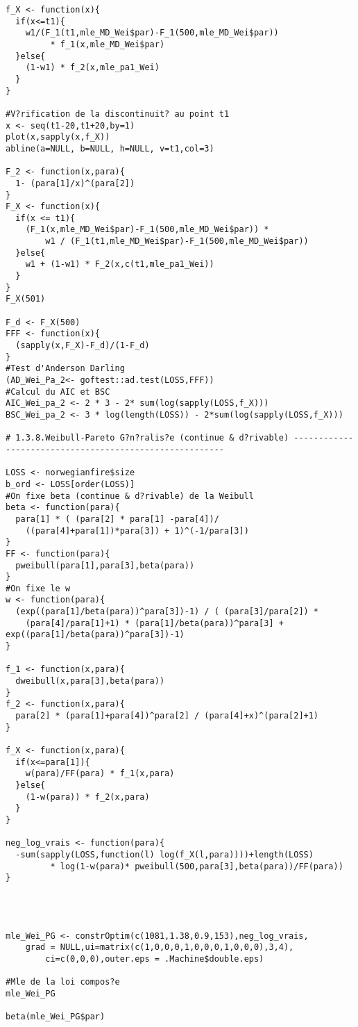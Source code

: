 \begin{verbatim}
f_X <- function(x){
  if(x<=t1){
    w1/(F_1(t1,mle_MD_Wei$par)-F_1(500,mle_MD_Wei$par))
    	 * f_1(x,mle_MD_Wei$par)
  }else{
    (1-w1) * f_2(x,mle_pa1_Wei)
  }
}

#V?rification de la discontinuit? au point t1
x <- seq(t1-20,t1+20,by=1)
plot(x,sapply(x,f_X))
abline(a=NULL, b=NULL, h=NULL, v=t1,col=3)

F_2 <- function(x,para){
  1- (para[1]/x)^(para[2])
}
F_X <- function(x){
  if(x <= t1){
    (F_1(x,mle_MD_Wei$par)-F_1(500,mle_MD_Wei$par)) * 
    	w1 / (F_1(t1,mle_MD_Wei$par)-F_1(500,mle_MD_Wei$par)) 
  }else{
    w1 + (1-w1) * F_2(x,c(t1,mle_pa1_Wei))
  }
}
F_X(501)

F_d <- F_X(500)
FFF <- function(x){
  (sapply(x,F_X)-F_d)/(1-F_d)
}
#Test d'Anderson Darling
(AD_Wei_Pa_2<- goftest::ad.test(LOSS,FFF))
#Calcul du AIC et BSC
AIC_Wei_pa_2 <- 2 * 3 - 2* sum(log(sapply(LOSS,f_X)))
BSC_Wei_pa_2 <- 3 * log(length(LOSS)) - 2*sum(log(sapply(LOSS,f_X)))

# 1.3.8.Weibull-Pareto G?n?ralis?e (continue & d?rivable) --------------------------------------------------------

LOSS <- norwegianfire$size
b_ord <- LOSS[order(LOSS)]
#On fixe beta (continue & d?rivable) de la Weibull
beta <- function(para){
  para[1] * ( (para[2] * para[1] -para[4])/ 
  	((para[4]+para[1])*para[3]) + 1)^(-1/para[3])
}
FF <- function(para){
  pweibull(para[1],para[3],beta(para))
}
#On fixe le w
w <- function(para){
  (exp((para[1]/beta(para))^para[3])-1) / ( (para[3]/para[2]) * 
  	(para[4]/para[1]+1) * (para[1]/beta(para))^para[3] +  exp((para[1]/beta(para))^para[3])-1) 
}

f_1 <- function(x,para){
  dweibull(x,para[3],beta(para))
}
f_2 <- function(x,para){
  para[2] * (para[1]+para[4])^para[2] / (para[4]+x)^(para[2]+1)
}

f_X <- function(x,para){
  if(x<=para[1]){
    w(para)/FF(para) * f_1(x,para)
  }else{
    (1-w(para)) * f_2(x,para)
  } 
}

neg_log_vrais <- function(para){
  -sum(sapply(LOSS,function(l) log(f_X(l,para))))+length(LOSS)
  		 * log(1-w(para)* pweibull(500,para[3],beta(para))/FF(para))
}




mle_Wei_PG <- constrOptim(c(1081,1.38,0.9,153),neg_log_vrais,
	grad = NULL,ui=matrix(c(1,0,0,0,1,0,0,0,1,0,0,0),3,4),
		ci=c(0,0,0),outer.eps = .Machine$double.eps)

#Mle de la loi compos?e
mle_Wei_PG

beta(mle_Wei_PG$par)


\end{verbatim}

